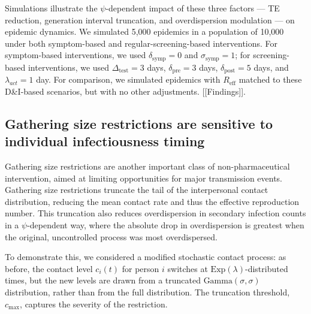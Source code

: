 Simulations illustrate the $\psi$-dependent impact of these three factors --- TE reduction, generation interval truncation, and overdispersion modulation --- on epidemic dynamics. We simulated 5,000 epidemics in a population of 10,000 under both symptom-based and regular-screening-based interventions. For symptom-based interventions, we used $\delta_\text{symp} = 0$ and $\sigma_\text{symp} = 1$; for screening-based interventions, we used $\Delta_\text{test} = 3$ days, $\delta_\text{pre} = 3$ days, $\delta_\text{post} = 5$ days, and $\lambda_{act} = 1$ day. For comparison, we simulated epidemics with $R_\text{eff}$ matched to these D\&I-based scenarios, but with no other adjustments. [[Findings]]. 

\subsection{Gathering size restrictions are sensitive to individual infectiousness timing}
\label{results:gathering-size-restrictions}

Gathering size restrictions are another important class of non-pharmaceutical intervention, aimed at limiting opportunities for major transmission events. Gathering size restrictions truncate the tail of the interpersonal contact distribution, reducing the mean contact rate and thus the effective reproduction number. This truncation also reduces overdispersion in secondary infection counts in a $\psi$-dependent way, where the absolute drop in overdispersion is greatest when the original, uncontrolled process was most overdispersed. 

To demonstrate this, we considered a modified stochastic contact process: as before, the contact level $c_i(t)$ for person $i$ switches at $\text{Exp}(\lambda)$-distributed times, but the new levels are drawn from a truncated $\text{Gamma}(\sigma,\sigma)$ distribution, rather than from the full distribution. The truncation threshold, $c_\text{max}$, captures the severity of the restriction. 

